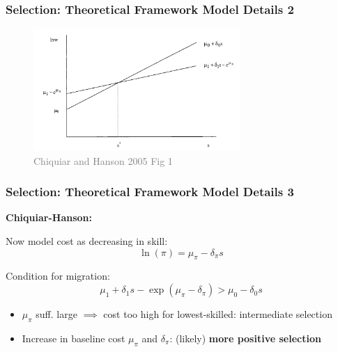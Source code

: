 \documentclass[xcolor=dvipsnames, compress, 12pt, aspectratio=169, handout]{beamer}
\begin{document}
\begin{frame}
    \label{theory2}
    \frametitle{Selection: Theoretical Framework Model Details 2 \hyperlink{theory_main}{}}
    \begin{figure}
        \includegraphics[width = 0.7\textwidth]{../../figs/slides/royborjas.png}
        \caption{\textcolor{gray}{Chiquiar and Hanson 2005 Fig 1}}
    \end{figure}
\end{frame}

\begin{frame}
    \label{theory3}
    \frametitle{Selection: Theoretical Framework Model Details 3 \hyperlink{theory_main}{}}
    \textbf{Chiquiar-Hanson:} \vspace{1mm}

    Now model cost as decreasing in skill: 
    \begin{equation}
        \ln(\pi) = \mu_{\pi} - \delta_{\pi}s 
    \end{equation} 
    \vspace{1mm}

    Condition for migration:
    \begin{equation}
        \mu_1 + \delta_1 s - \exp(\mu_{\pi} - \delta_{\pi}) > \mu_0 - \delta_0s
    \end{equation}
    \vspace{1mm}
    \begin{itemize}
        \item $\mu_{\pi}$ suff. large $\implies$ cost too high for lowest-skilled: intermediate selection \vspace{1mm}
        \item Increase in baseline cost $\mu_{\pi}$ and $\delta_{\pi}$: (likely) \textbf{more positive selection}
    \end{itemize}
\end{frame}
\end{document}
